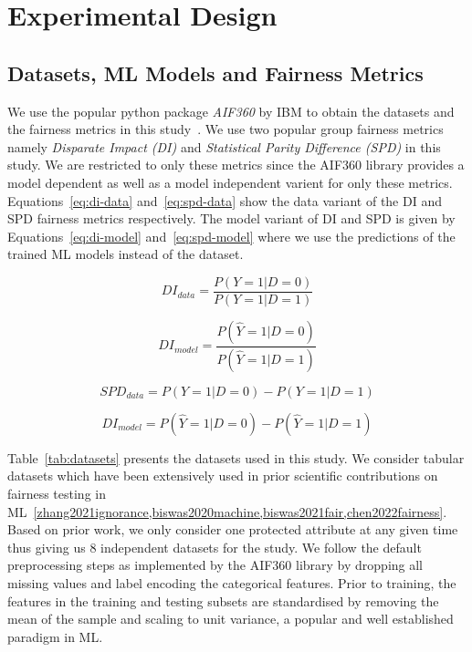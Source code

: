 \documentclass{article}
\begin{document}

\section{Experimental Design}\label{sec:method}

\subsection{Datasets, ML Models and Fairness Metrics}\label{sec:method-parameters}

We use the popular python package \emph{AIF360} by IBM to obtain the
datasets and the fairness metrics in this study \cite{bellamy2019ai}.
We use two popular group fairness metrics namely \emph{Disparate
Impact (DI)} and \emph{Statistical Parity Difference (SPD)} in this
study. We are restricted to only these metrics since the AIF360
library provides a model dependent as well as a model independent
varient for only these metrics. Equations \ref{eq:di-data}
and \ref{eq:spd-data} show the data variant of the DI and SPD fairness
metrics respectively. The model variant of DI and SPD is given by
Equations \ref{eq:di-model} and \ref{eq:spd-model} where we use the
predictions of the trained ML models instead of the dataset.

\begin{equation}
  DI_{data} = \frac{P(Y=1|D=0)}{P(Y=1|D=1)}
  \label{eq:di-data}
\end{equation}

\begin{equation}
  DI_{model} = \frac{P(\hat{Y}=1|D=0)}{P(\hat{Y}=1|D=1)}
  \label{eq:di-model}
\end{equation}

\begin{equation}
  SPD_{data} = P(Y=1|D=0)-P(Y=1|D=1)
  \label{eq:spd-data}
\end{equation}

\begin{equation}
  DI_{model} = P(\hat{Y}=1|D=0)-P(\hat{Y}=1|D=1)
  \label{eq:spd-model}
\end{equation}

Table \ref{tab:datasets} presents the datasets used in this study. We
consider tabular datasets which have been extensively used in prior
scientific contributions on fairness testing in
ML \ref{zhang2021ignorance,biswas2020machine,biswas2021fair,chen2022fairness}.
Based on prior work, we only consider one protected attribute at any
given time thus giving us 8 independent datasets for the study. We
follow the default preprocessing steps as implemented by the AIF360
library by dropping all missing values and label encoding the
categorical features. Prior to training, the features in the training
and testing subsets are standardised by removing the mean of the
sample and scaling to unit variance, a popular and well established
paradigm in ML.
\end{document}
